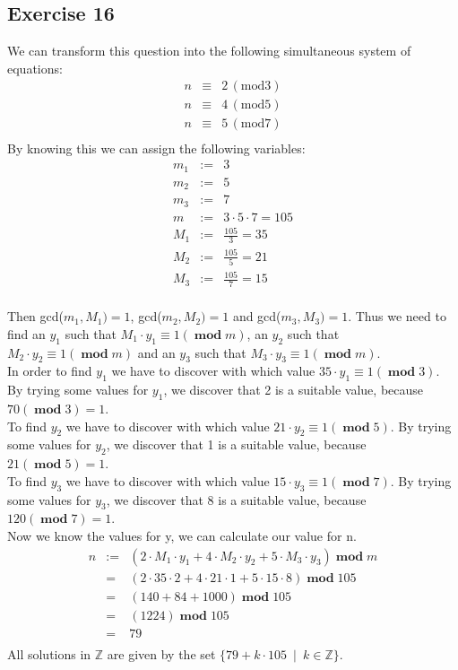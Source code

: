 \documentclass[a4paper]{article}
\newcommand{\exercise}[2]{\subsection*{Exercise #1}{#2}}
\newcommand{\ZZ}{\ensuremath{\mathbb{Z}}}
\DeclareMathOperator{\emod}{\mathbf{mod}}
\newcommand{\tmod}{\mbox{mod}\xspace}
\begin{document}
\exercise{16}{%
We can transform this question into the following simultaneous
system of equations:
\begin{eqnarray*}
n &\equiv & 2 \, (\tmod 3)\\
n &\equiv & 4 \, (\tmod 5)\\
n &\equiv & 5 \, (\tmod 7)\\
\end{eqnarray*}
By knowing this we can assign the following variables:
\begin{eqnarray*}
    m_1 &:=& 3 \\
    m_2 &:=& 5 \\
    m_3 &:=& 7 \\
    m &:=& 3 \cdot 5 \cdot 7 = 105 \\
    M_1 &:=& \frac{105}{3} = 35 \\
    M_2 &:=& \frac{105}{5} = 21 \\
    M_3 &:=& \frac{105}{7} = 15 \\
\end{eqnarray*}

Then gcd($m_1, M_1) = 1$, gcd($m_2, M_2) = 1$ and gcd($m_3, M_3) = 1$.
Thus we need to find an $y_1$ such that $M_1 \cdot y_1 \equiv 1 (\emod m)$, an $y_2$ such that $M_2 \cdot y_2 \equiv 1 (\emod m)$ and an $y_3$ such that $M_3 \cdot y_3 \equiv 1 (\emod m)$. \\
In order to find $y_1$ we have to discover with which value $35 \cdot y_1 \equiv 1 (\emod 3)$. By trying some values for $y_1$, we discover that 2 is a suitable value, because $70 (\emod 3) = 1$. \\
To find $y_2$ we have to discover with which value $21 \cdot y_2 \equiv 1 (\emod 5)$. By trying some values for $y_2$, we discover that 1 is a suitable value, because $21 (\emod 5) = 1$. \\
To find $y_3$ we have to discover with which value $15 \cdot y_3 \equiv 1 (\emod 7)$. By trying some values for $y_3$, we discover that 8 is a suitable value, because $120 (\emod 7) = 1$. \\

Now we know the values for y, we can calculate our value for n.
\begin{eqnarray*}
    n &:=& (2 \cdot M_1 \cdot y_1 + 4 \cdot M_2 \cdot y_2 + 5 \cdot M_3 \cdot y_3) \emod m \\
        &=& (2 \cdot 35 \cdot 2 + 4 \cdot 21 \cdot 1 + 5 \cdot 15 \cdot 8)\emod 105 \\
        &=& (140 + 84 + 1000)\emod 105 \\
        &=& (1224)\emod 105 \\
        &=& 79 \\
\end{eqnarray*}
All solutions in $\ZZ$ are given by the set $\{79 + k \cdot 105 \enspace | \enspace k \in \ZZ \}$.

}
\end{document}
